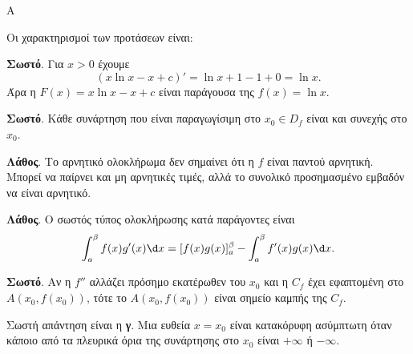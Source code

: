 \begin{thema}{Α}
\begin{erwthma}
\item {}

\item {}

\item {}

\item Οι χαρακτηρισμοί των προτάσεων είναι:
\begin{alist}
\item \textbf{Σωστό}. Για $x>0$ έχουμε
\[ (x\ln{x}-x+c)'=\ln{x}+1-1+0=\ln{x}. \]
Άρα η $F(x)=x\ln{x}-x+c$ είναι παράγουσα της $f(x)=\ln{x}$.
\item \textbf{Σωστό}. Κάθε συνάρτηση που είναι παραγωγίσιμη στο $x_0\in D_f$ είναι και συνεχής στο $x_0$.
\item \textbf{Λάθος}. Το αρνητικό ολοκλήρωμα δεν σημαίνει ότι η $f$ είναι παντού αρνητική. Μπορεί να παίρνει και μη αρνητικές τιμές, αλλά το συνολικό προσημασμένο εμβαδόν να είναι αρνητικό.
\item \textbf{Λάθος}. Ο σωστός τύπος ολοκλήρωσης κατά παράγοντες είναι
\[ \dint_a^\beta f(x)g'(x)\d x=[f(x)g(x)]_a^\beta-\dint_a^\beta f'(x)g(x)\d x. \]
\item \textbf{Σωστό}. Αν η $f''$ αλλάζει πρόσημο εκατέρωθεν του $x_0$ και η $C_f$ έχει εφαπτομένη στο $A(x_0,f(x_0))$, τότε το $A(x_0,f(x_0))$ είναι σημείο καμπής της $C_f$.
\end{alist}

\item Σωστή απάντηση είναι η \textbf{γ}. Μια ευθεία $x=x_0$ είναι κατακόρυφη ασύμπτωτη όταν κάποιο από τα πλευρικά όρια της συνάρτησης στο $x_0$ είναι $+\infty$ ή $-\infty$.
\end{erwthma}
\end{thema}

